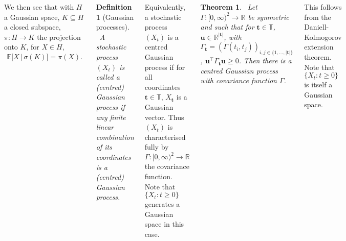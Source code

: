 \documentclass{tikzposter} %
\newcommand\rightopen[2]{\ensuremath{[#1,#2)}}
\newtheorem{theorem}{Theorem}
\newtheorem{definition}{Definition}
\begin{document}
\begin{columns}
{    We then see that with $H$ a Gaussian space, $K \subseteq H$ a closed subspace, $\pi : H \to K$ the projection onto $K$, for $X \in H$,
    \begin{align*}
      \mathbb{E}\big[X \,|\, \sigma(K)\big] = \pi(X).
    \end{align*}

    \begin{definition}[Gaussian processes]
    \ A stochastic process $(X_{t})$ is called a (centred) Gaussian process if any finite linear combination of its coordinates is a (centred) Gaussian process.
    \end{definition}
    \hphantom{}

    Equivalently, a stochastic process $(X_{t})$  is a centred Gaussian process if for all coordinates $\bm{t} \in \mathbb{T}$, $X_{\bm{t}}$ is a Gaussian vector. Thus $(X_{t})$ is characterised fully by $\Gamma : \rightopen{0}{\infty}^{2} \to \mathbb{R}$ the covariance function. \\

    Note that $\{X_{t} : t \ge 0\}$ generates a Gaussian space in this case. \\

    \begin{theorem}
    \ Let $\Gamma : \rightopen{0}{\infty}^{2} \to \mathbb{R}$ be symmetric and such that for $\bm{t} \in \mathbb{T}$, $\bm{u} \in \mathbb{R}^{|\bm{t}|}$, with $\Gamma_{\bm{t}} = (\Gamma(t_{i},t_{j}))_{i,j \in \{1,\dots,|\bm{t}|\}}$, $\bm{u}^{\top}\Gamma_{\bm{t}}\bm{u} \ge 0$. Then there is a centred Gaussian process with covariance function $\Gamma$.
    \end{theorem}
    \hphantom{}

    This follows from the Daniell-Kolmogorov extension theorem. \\

    Note that $\{X_{t} : t \ge 0\}$ is itself a Gaussian space.
  }
\end{columns}
\end{document}
